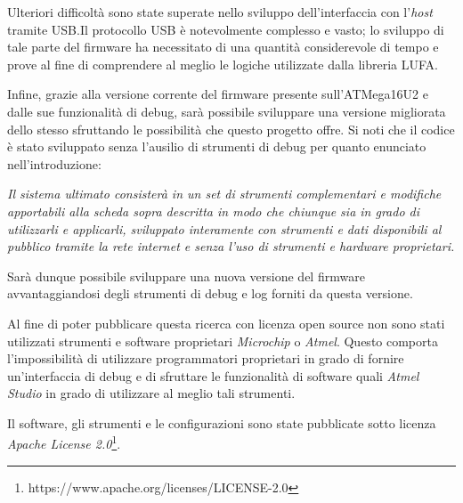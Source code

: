 Ulteriori difficoltà sono state superate nello sviluppo dell'interfaccia con l'\textit{host} tramite USB.\@ Il protocollo USB è notevolmente complesso e vasto; lo sviluppo di tale parte del firmware ha necessitato di una quantità considerevole di tempo e prove al fine di comprendere al meglio le logiche utilizzate dalla libreria LUFA.\@

Infine, grazie alla versione corrente del firmware presente sull'ATMega16U2 e dalle sue funzionalità di debug, sarà possibile sviluppare una versione migliorata dello stesso sfruttando le possibilità che questo progetto offre. Si noti che il codice è stato sviluppato senza l'ausilio di strumenti di debug per quanto enunciato nell'introduzione:
\begin{center}
    \textit{Il sistema ultimato consisterà in un set di strumenti complementari e modifiche apportabili alla scheda sopra descritta in modo che chiunque sia in grado di utilizzarli e applicarli, sviluppato interamente con strumenti e dati disponibili al pubblico tramite la rete internet e senza l'uso di strumenti e hardware proprietari.}
\end{center}

Sarà dunque possibile sviluppare una nuova versione del firmware avvantaggiandosi degli strumenti di debug e log forniti da questa versione.

Al fine di poter pubblicare questa ricerca con licenza open source non sono stati utilizzati strumenti e software proprietari \textit{Microchip} o \textit{Atmel}. Questo comporta l'impossibilità di utilizzare programmatori proprietari in grado di fornire un'interfaccia di debug e di sfruttare le funzionalità di software quali \textit{Atmel Studio} in grado di utilizzare al meglio tali strumenti.

Il software, gli strumenti e le configurazioni sono state pubblicate sotto licenza \textit{Apache License 2.0}\footnote{https://www.apache.org/licenses/LICENSE-2.0}.
